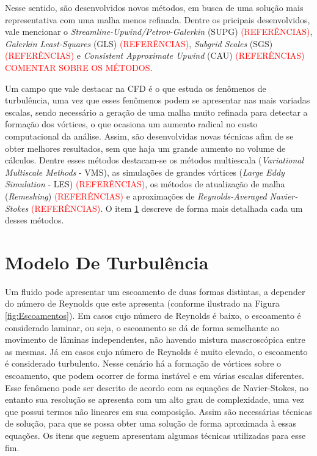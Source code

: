 \documentclass[_ArquivoPrincipal.tex]{subfiles}
\begin{document}
Nesse sentido, são desenvolvidos novos métodos, em busca de uma solução mais representativa com uma malha menos refinada. Dentre os pricipais desenvolvidos, vale mencionar o \textit{Streamline-Upwind/Petrov-Galerkin} (SUPG) \textcolor{red}{(REFERÊNCIAS)}, \textit{Galerkin Least-Squares} (GLS) \textcolor{red}{(REFERÊNCIAS)}, \textit{Subgrid Scales} (SGS) \textcolor{red}{(REFERÊNCIAS)} e \textit{Consistent Approximate Upwind} (CAU) \textcolor{red}{(REFERÊNCIAS)} \textcolor{red}{COMENTAR SOBRE OS MÉTODOS}.

Um campo que vale destacar na CFD é o que estuda os fenômenos de turbulência, uma vez que esses fenômenos podem se apresentar nas mais variadas escalas, sendo necessário a geração de uma malha muito refinada para detectar a formação dos vórtices, o que ocasiona um aumento radical no custo computacional da análise. Assim, são desenvolvidas novas técnicas afim de se obter melhores resultados, sem que haja um grande aumento no volume de cálculos. Dentre esses métodos destacam-se os métodos multiescala (\textit{Variational Multiscale Methods} - VMS), as simulações de grandes vórtices (\textit{Large Eddy Simulation} - LES) \textcolor{red}{(REFERÊNCIAS)}, os métodos de atualização de malha (\textit{Remeshing}) \textcolor{red}{(REFERÊNCIAS)} e aproximações de \textit{Reynolds-Averaged Navier-Stokes} \textcolor{red}{(REFERÊNCIAS)}. O item \ref{MT} descreve de forma mais detalhada cada um desses métodos.

\section{Modelo De Turbulência} \label{MT}

Um fluido pode apresentar um escoamento de duas formas distintas, a depender do número de Reynolds que este apresenta (conforme ilustrado na Figura \ref{fig:Escoamentos}). Em casos cujo número de Reynolds é baixo, o escoamento é considerado laminar, ou seja, o escoamento se dá de forma semelhante ao movimento de lâminas independentes, não havendo mistura mascroscópica entre as mesmas. Já em casos cujo número de Reynolds é muito elevado, o escoamento é considerado turbulento. Nesse cenário há a formação de vórtices sobre o escoamento, que podem ocorrer de forma instável e em várias escalas diferentes. Esse fenômeno pode ser descrito de acordo com as equações de Navier-Stokes, no entanto sua resolução se apresenta com um alto grau de complexidade, uma vez que possui termos não lineares em sua composição. Assim são necessárias técnicas de solução, para que se possa obter uma solução de forma aproximada à essas equações. Os itens que seguem apresentam algumas técnicas utilizadas para esse fim.
\end{document}
